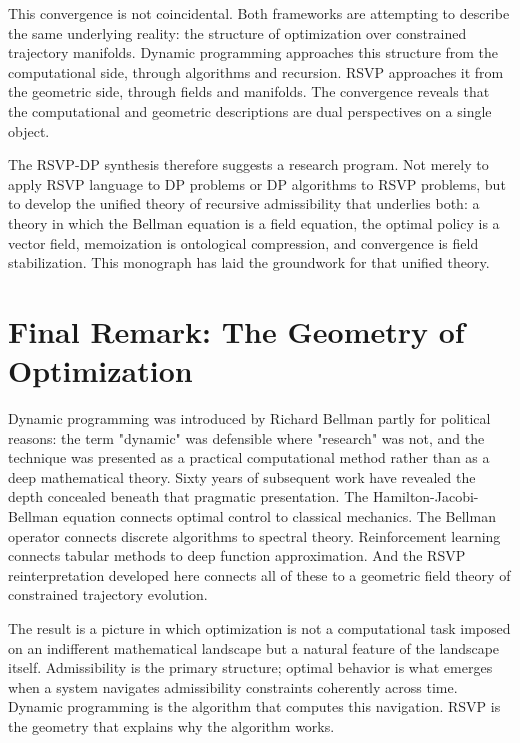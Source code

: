 \documentclass[12pt, a4paper, openany]{book}
\theoremstyle{plain}
\theoremstyle{definition}
\theoremstyle{remark}
\begin{document}
This convergence is not coincidental. Both frameworks are attempting to describe the same underlying reality: the structure of optimization over constrained trajectory manifolds. Dynamic programming approaches this structure from the computational side, through algorithms and recursion. RSVP approaches it from the geometric side, through fields and manifolds. The convergence reveals that the computational and geometric descriptions are dual perspectives on a single object.

The RSVP-DP synthesis therefore suggests a research program. Not merely to apply RSVP language to DP problems or DP algorithms to RSVP problems, but to develop the unified theory of recursive admissibility that underlies both: a theory in which the Bellman equation is a field equation, the optimal policy is a vector field, memoization is ontological compression, and convergence is field stabilization. This monograph has laid the groundwork for that unified theory.

\section{Final Remark: The Geometry of Optimization}

Dynamic programming was introduced by Richard Bellman partly for political reasons: the term "dynamic" was defensible where "research" was not, and the technique was presented as a practical computational method rather than as a deep mathematical theory. Sixty years of subsequent work have revealed the depth concealed beneath that pragmatic presentation. The Hamilton-Jacobi-Bellman equation connects optimal control to classical mechanics. The Bellman operator connects discrete algorithms to spectral theory. Reinforcement learning connects tabular methods to deep function approximation. And the RSVP reinterpretation developed here connects all of these to a geometric field theory of constrained trajectory evolution.

The result is a picture in which optimization is not a computational task imposed on an indifferent mathematical landscape but a natural feature of the landscape itself. Admissibility is the primary structure; optimal behavior is what emerges when a system navigates admissibility constraints coherently across time. Dynamic programming is the algorithm that computes this navigation. RSVP is the geometry that explains why the algorithm works.

\appendix
\end{document}
